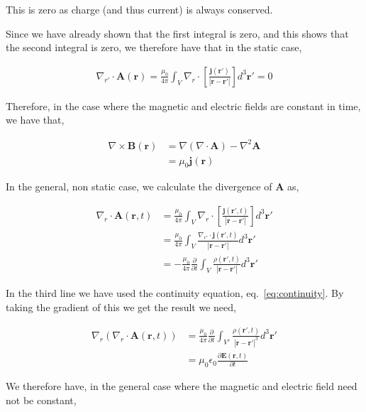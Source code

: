 \documentclass[11pt]{amsart}
\begin{document}
This is zero as charge (and thus current) is always conserved.

Since we have already shown that the first integral is zero, and this shows that the second integral is zero, we therefore have that in the static case,

\begin{align*}
  \nabla_{r'}\cdot\mathbf{A}(\mathbf{r}) = \frac{\mu_0}{4\pi}\int_V\nabla_r\cdot\left[\frac{\mathbf{j}(\mathbf{r'})}{|\mathbf{r}-\mathbf{r'}|}\right]d^3\mathbf{r'} = 0
\end{align*}

Therefore, in the case where the magnetic and electric fields are constant in time, we have that,

\begin{align*}
  \nabla\times\mathbf{B}(\mathbf{r})&=\nabla(\nabla\cdot\mathbf{A})-\nabla^2\mathbf{A} \\
  &=\mu_0\mathbf{j}(\mathbf{r})
\end{align*}

In the general, non static case, we calculate the divergence of $\mathbf{A}$ as,

\begin{align*}
  \nabla_r\cdot\mathbf{A}(\mathbf{r}, t)&=\frac{\mu_0}{4\pi}\int_V\nabla_r\cdot\left[\frac{\mathbf{j}(\mathbf{r'}, t)}{|\mathbf{r}-\mathbf{r'}|}\right]d^3\mathbf{r'} \\
  &=\frac{\mu_0}{4\pi}\int_V\frac{\nabla_{r'}\cdot\mathbf{j}(\mathbf{r'}, t)}{|\mathbf{r}-\mathbf{r'}|}d^3\mathbf{r'} \\
  &=-\frac{\mu_0}{4\pi}\frac{\partial}{\partial t}\int_V\frac{\rho(\mathbf{r'}, t)}{|\mathbf{r}-\mathbf{r'}|}d^3\mathbf{r'}
\end{align*}

In the third line we have used the continuity equation, eq.~\ref{eq:continuity}. By taking the gradient of this we get the result we need,

\begin{align*}
  \nabla_r\left(\nabla_r\cdot\mathbf{A}(\mathbf{r}, t)\right) &=\frac{\mu_0}{4\pi}\frac{\partial}{\partial t}\int_{V'}\frac{\rho(\mathbf{r'}, t)}{{|\mathbf{r}-\mathbf{r'}|}^3}d^3\mathbf{r'} \\
  &= \mu_0\epsilon_0\frac{\partial\mathbf{E}(\mathbf{r}, t)}{\partial t}
\end{align*}

We therefore have, in the general case where the magnetic and electric field need not be constant,
\end{document}
